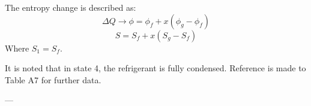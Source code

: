 The entropy change is described as:  
\[
\Delta Q \rightarrow \phi = \phi_f + x (\phi_g - \phi_f)
\]  
\[
S = S_f + x (S_g - S_f)
\]  
Where \( S_1 = S_f \).  

It is noted that in state 4, the refrigerant is fully condensed. Reference is made to Table A7 for further data.

---